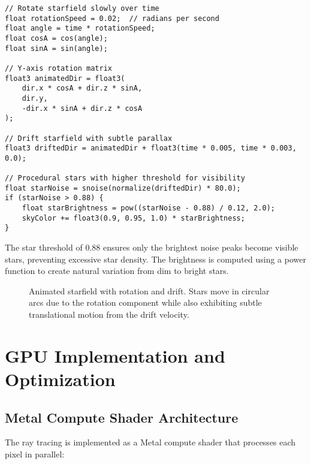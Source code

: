 \documentclass[12pt,a4paper]{article}
\theoremstyle{definition}
\theoremstyle{remark}
\begin{document}
\begin{lstlisting}[style=metalstyle, caption=Animated starfield implementation]
// Rotate starfield slowly over time
float rotationSpeed = 0.02;  // radians per second
float angle = time * rotationSpeed;
float cosA = cos(angle);
float sinA = sin(angle);

// Y-axis rotation matrix
float3 animatedDir = float3(
    dir.x * cosA + dir.z * sinA,
    dir.y,
    -dir.x * sinA + dir.z * cosA
);

// Drift starfield with subtle parallax
float3 driftedDir = animatedDir + float3(time * 0.005, time * 0.003, 0.0);

// Procedural stars with higher threshold for visibility
float starNoise = snoise(normalize(driftedDir) * 80.0);
if (starNoise > 0.88) {
    float starBrightness = pow((starNoise - 0.88) / 0.12, 2.0);
    skyColor += float3(0.9, 0.95, 1.0) * starBrightness;
}
\end{lstlisting}

The star threshold of 0.88 ensures only the brightest noise peaks become visible stars, preventing excessive star density. The brightness is computed using a power function to create natural variation from dim to bright stars.

\begin{figure}[H]
    \centering
    \caption{Animated starfield with rotation and drift. Stars move in circular arcs due to the rotation component while also exhibiting subtle translational motion from the drift velocity.}
    \label{fig:animated_starfield}
\end{figure}

\section{GPU Implementation and Optimization}

\subsection{Metal Compute Shader Architecture}

The ray tracing is implemented as a Metal compute shader that processes each pixel in parallel:
\end{document}
